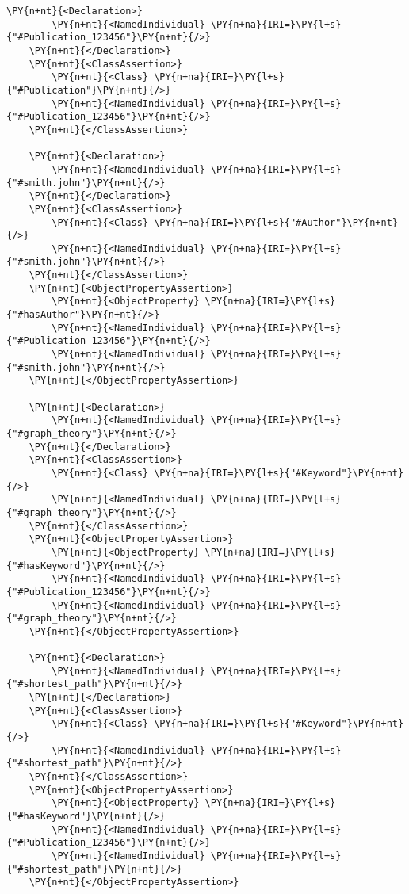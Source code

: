 \begin{Verbatim}[commandchars=\\\{\}, fontsize=\footnotesize, frame=single]
    \PY{n+nt}{<Declaration>}
        \PY{n+nt}{<NamedIndividual} \PY{n+na}{IRI=}\PY{l+s}{"#Publication_123456"}\PY{n+nt}{/>}
    \PY{n+nt}{</Declaration>}
    \PY{n+nt}{<ClassAssertion>}
        \PY{n+nt}{<Class} \PY{n+na}{IRI=}\PY{l+s}{"#Publication"}\PY{n+nt}{/>}
        \PY{n+nt}{<NamedIndividual} \PY{n+na}{IRI=}\PY{l+s}{"#Publication_123456"}\PY{n+nt}{/>}
    \PY{n+nt}{</ClassAssertion>}

    \PY{n+nt}{<Declaration>}
        \PY{n+nt}{<NamedIndividual} \PY{n+na}{IRI=}\PY{l+s}{"#smith.john"}\PY{n+nt}{/>}
    \PY{n+nt}{</Declaration>}
    \PY{n+nt}{<ClassAssertion>}
        \PY{n+nt}{<Class} \PY{n+na}{IRI=}\PY{l+s}{"#Author"}\PY{n+nt}{/>}
        \PY{n+nt}{<NamedIndividual} \PY{n+na}{IRI=}\PY{l+s}{"#smith.john"}\PY{n+nt}{/>}
    \PY{n+nt}{</ClassAssertion>}
    \PY{n+nt}{<ObjectPropertyAssertion>}
        \PY{n+nt}{<ObjectProperty} \PY{n+na}{IRI=}\PY{l+s}{"#hasAuthor"}\PY{n+nt}{/>}
        \PY{n+nt}{<NamedIndividual} \PY{n+na}{IRI=}\PY{l+s}{"#Publication_123456"}\PY{n+nt}{/>}
        \PY{n+nt}{<NamedIndividual} \PY{n+na}{IRI=}\PY{l+s}{"#smith.john"}\PY{n+nt}{/>}
    \PY{n+nt}{</ObjectPropertyAssertion>}

    \PY{n+nt}{<Declaration>}
        \PY{n+nt}{<NamedIndividual} \PY{n+na}{IRI=}\PY{l+s}{"#graph_theory"}\PY{n+nt}{/>}
    \PY{n+nt}{</Declaration>}
    \PY{n+nt}{<ClassAssertion>}
        \PY{n+nt}{<Class} \PY{n+na}{IRI=}\PY{l+s}{"#Keyword"}\PY{n+nt}{/>}
        \PY{n+nt}{<NamedIndividual} \PY{n+na}{IRI=}\PY{l+s}{"#graph_theory"}\PY{n+nt}{/>}
    \PY{n+nt}{</ClassAssertion>}
    \PY{n+nt}{<ObjectPropertyAssertion>}
        \PY{n+nt}{<ObjectProperty} \PY{n+na}{IRI=}\PY{l+s}{"#hasKeyword"}\PY{n+nt}{/>}
        \PY{n+nt}{<NamedIndividual} \PY{n+na}{IRI=}\PY{l+s}{"#Publication_123456"}\PY{n+nt}{/>}
        \PY{n+nt}{<NamedIndividual} \PY{n+na}{IRI=}\PY{l+s}{"#graph_theory"}\PY{n+nt}{/>}
    \PY{n+nt}{</ObjectPropertyAssertion>}

    \PY{n+nt}{<Declaration>}
        \PY{n+nt}{<NamedIndividual} \PY{n+na}{IRI=}\PY{l+s}{"#shortest_path"}\PY{n+nt}{/>}
    \PY{n+nt}{</Declaration>}
    \PY{n+nt}{<ClassAssertion>}
        \PY{n+nt}{<Class} \PY{n+na}{IRI=}\PY{l+s}{"#Keyword"}\PY{n+nt}{/>}
        \PY{n+nt}{<NamedIndividual} \PY{n+na}{IRI=}\PY{l+s}{"#shortest_path"}\PY{n+nt}{/>}
    \PY{n+nt}{</ClassAssertion>}
    \PY{n+nt}{<ObjectPropertyAssertion>}
        \PY{n+nt}{<ObjectProperty} \PY{n+na}{IRI=}\PY{l+s}{"#hasKeyword"}\PY{n+nt}{/>}
        \PY{n+nt}{<NamedIndividual} \PY{n+na}{IRI=}\PY{l+s}{"#Publication_123456"}\PY{n+nt}{/>}
        \PY{n+nt}{<NamedIndividual} \PY{n+na}{IRI=}\PY{l+s}{"#shortest_path"}\PY{n+nt}{/>}
    \PY{n+nt}{</ObjectPropertyAssertion>}

\end{Verbatim}

